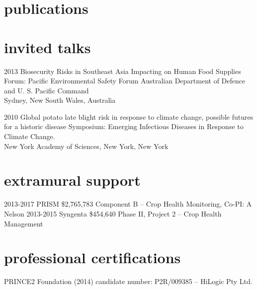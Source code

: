\documentclass[]{friggeri-cv}
\begin{document}



\section{publications}

\begin{refsection}
  \nocite{*}
  \printbibliography[sorting=chronological, type=inreview, title={in review}, heading=subbibliography]
\end{refsection}
\begin{refsection}
  \nocite{*}
  \printbibliography[sorting=chronological, type=inproceedings, title={conferences/proceedings},  heading=subbibliography]
\end{refsection}
\begin{refsection}
  \nocite{*}
  \printbibliography[sorting=chronological, type=inbook, title={book chapters}, heading=subbibliography]
\end{refsection}
\begin{refsection}
  \nocite{*}
  \printbibliography[sorting=chronological, type=report, title={reports}, heading=subbibliography]
\end{refsection}

\section{invited talks}
\begin{entrylist}
\entry
{2013}
{Biosecurity Risks in Southeast Asia Impacting on Human Food Supplies}
{}
{Forum: Pacific Environmental Safety Forum Australian Department of Defence and U. S. Pacific Command\\Sydney, New South Wales, Australia}

\entry
{2010} 
{Global potato late blight risk in response to climate change, possible futures for a historic disease}
{}
{Symposium: Emerging Infectious Diseases in Response to Climate Change.\\New York Academy of Sciences, New York, New York}
\end{entrylist}

\section{extramural support}
  \begin{entrylist}
  \entry
	{2013-2017}
	{PRISM }
	{\$2,765,783}
	{Component B -- Crop Health Monitoring, Co-PI: A Nelson}
  \entry
	{2013-2015}
	{Syngenta}
	{\$454,640}
	{Phase II, Project 2 -- Crop Health Management}
  \end{entrylist}


\section{professional certifications}
PRINCE2 Foundation (2014) candidate number: P2R/009385 – HiLogic  Pty Ltd.


\end{document}
